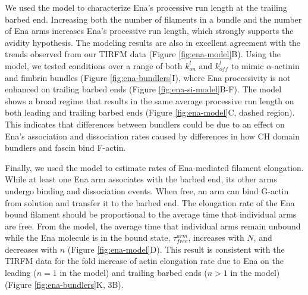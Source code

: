 \begin{figure}[!htb]
\end{figure}

We used the model to characterize Ena's processive run length at the trailing barbed end. Increasing both the number of filaments in a bundle and the number of Ena arms increases Ena's processive run length, which strongly supports the avidity hypothesis. The modeling results are also in excellent agreement with the trends observed from our TIRFM data (Figure \ref{fig:ena-model}B). Using the model, we tested conditions over a range of both $k_{on}^{l}$ and $k_{off}^{l}$ to mimic $\alpha$-actinin and fimbrin bundles (Figure \ref{fig:ena-bundlers}I), where Ena processivity is not enhanced on trailing barbed ends (Figure \ref{fig:ena-si-model}B-F). The model shows a broad regime that results in the same average processive run length on both leading and trailing barbed ends (Figure \ref{fig:ena-model}C, dashed region). This indicates that differences between bundlers could be due to an effect on Ena's association and dissociation rates caused by differences in how CH domain bundlers and fascin bind F-actin. 

Finally, we used the model to estimate rates of Ena-mediated filament elongation. While at least one Ena arm associates with the barbed end, its other arms undergo binding and dissociation events. When free, an arm can bind G-actin from solution and transfer it to the barbed end. The elongation rate of the Ena bound filament should be proportional to the average time that individual arms are free. From the model, the average time that individual arms remain unbound while the Ena molecule is in the bound state, $\tau_{free}^{arm}$, increases with $N$, and decreases with $n$ (Figure \ref{fig:ena-model}D). This result is consistent with the TIRFM data for the fold increase of actin elongation rate due to Ena on the leading ($n=1$ in the model) and trailing barbed ends ($n>1$ in the model) (Figure \ref{fig:ena-bundlers}K, 3B).

